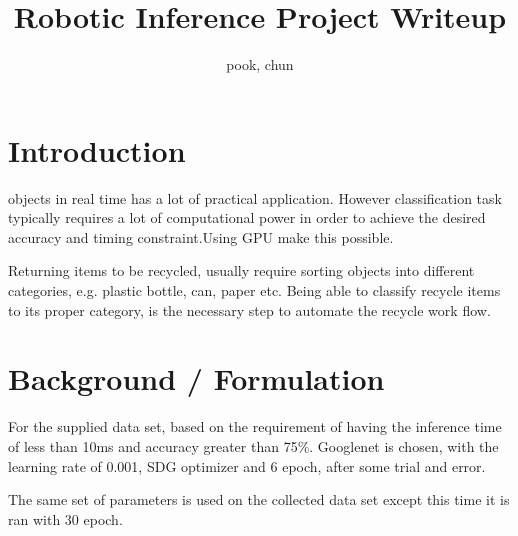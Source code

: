 \documentclass[10pt,journal,compsoc]{IEEEtran}
\begin{document}
\title{Robotic Inference Project Writeup}

\author{pook, chun}

%
{}


\maketitle
\IEEEdisplaynontitleabstractindextext
\IEEEpeerreviewmaketitle
\section{Introduction}
\label{sec:introduction}

 objects in real time has
a lot of practical application. However classification task typically
requires a lot of computational power in order to achieve the desired
accuracy and timing constraint.Using GPU make this possible.

Returning items to be recycled, usually require sorting objects into different categories, e.g. plastic bottle, can, paper etc. Being able to classify recycle items to its proper category, is the necessary step to automate the recycle work flow.

\section{Background / Formulation}
For the supplied data set, based on the requirement of having the inference time of less than 10ms and accuracy greater than 75\%. Googlenet is chosen, with the learning rate of 0.001, SDG optimizer and 6 epoch, after some trial and error.

The same set of parameters is used on the collected data set except this time it is ran with 30 epoch.
\end{document}
